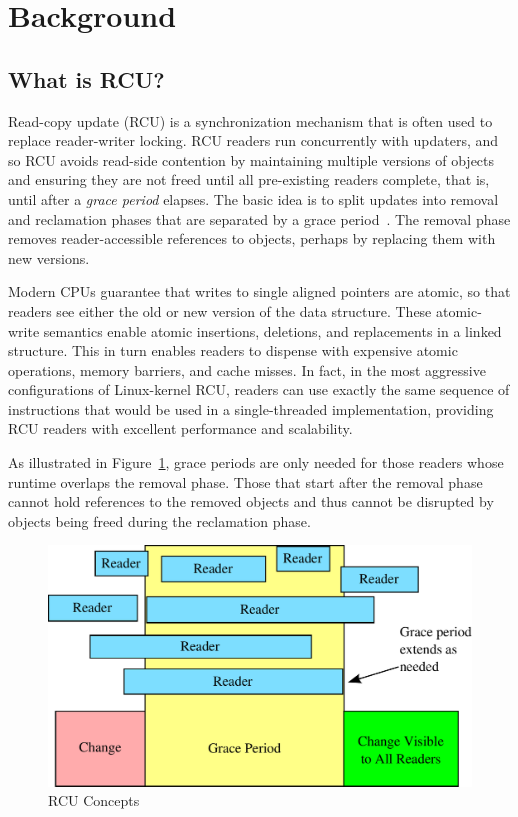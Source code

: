 \section{Background}

\subsection{What is RCU?}

Read-copy update (RCU) is a synchronization mechanism
that is often used to replace reader-writer locking.
RCU readers run concurrently with updaters,
and so RCU avoids read-side contention by maintaining multiple versions of
objects and ensuring 
they are not freed until all pre-existing readers complete, that is,
until after a \emph{grace period} elapses.
The basic idea is to split updates into removal
and reclamation phases that are separated by a grace period~\cite{McKenneyRCU98}.
The removal phase removes reader-accessible references 
to objects, perhaps by replacing them with new versions.

Modern CPUs guarantee that writes to single aligned
pointers are atomic, so that readers
see either the old or new version of the data structure.
These atomic-write semantics enable atomic
insertions, deletions, and replacements in a linked structure.
This in turn enables readers to dispense with expensive
atomic operations, memory barriers, and cache misses.
In fact, in the most aggressive configurations of Linux-kernel RCU, readers
can use exactly the same sequence of instructions that would be used in
a single-threaded implementation, providing
RCU readers with excellent performance and scalability.

As illustrated in Figure~\ref{fig:rcu_concepts}, grace periods are only
needed for those readers whose runtime overlaps the removal phase.
Those that start after the removal 
phase cannot hold references to the removed objects and thus
cannot be disrupted by objects being freed during the reclamation phase.

\begin{figure}[tbp]
\centering
\includegraphics[scale=0.35]{rcu_concepts.pdf}
\caption{RCU Concepts}
\label{fig:rcu_concepts}
\end{figure}



